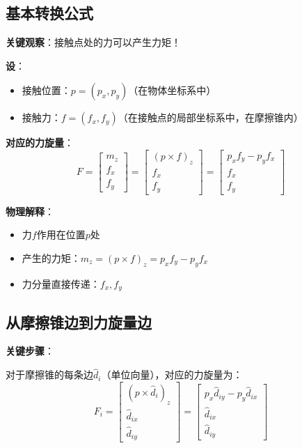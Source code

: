 \documentclass[12pt,a4paper]{article}
\begin{document}
\subsection{基本转换公式}

\textbf{关键观察}：接触点处的力可以产生力矩！

\textbf{设}：
\begin{itemize}
\item 接触位置：$p = (p_x, p_y)$（在物体坐标系中）
\item 接触力：$f = (f_x, f_y)$（在接触点的局部坐标系中，在摩擦锥内）
\end{itemize}

\textbf{对应的力旋量}：
\begin{equation}
F = \begin{bmatrix} m_z \\ f_x \\ f_y \end{bmatrix} = \begin{bmatrix} (p \times f)_z \\ f_x \\ f_y \end{bmatrix} = \begin{bmatrix} p_x f_y - p_y f_x \\ f_x \\ f_y \end{bmatrix}
\label{eq:force_to_wrench}
\end{equation}

\textbf{物理解释}：
\begin{itemize}
\item 力$f$作用在位置$p$处
\item 产生的力矩：$m_z = (p \times f)_z = p_x f_y - p_y f_x$
\item 力分量直接传递：$f_x, f_y$
\end{itemize}

\subsection{从摩擦锥边到力旋量边}

\textbf{关键步骤}：

对于摩擦锥的每条边$\hat{d}_i$（单位向量），对应的力旋量为：
\begin{equation}
F_i = \begin{bmatrix} (p \times \hat{d}_i)_z \\ \hat{d}_{ix} \\ \hat{d}_{iy} \end{bmatrix} = \begin{bmatrix} p_x \hat{d}_{iy} - p_y \hat{d}_{ix} \\ \hat{d}_{ix} \\ \hat{d}_{iy} \end{bmatrix}
\label{eq:cone_edge_to_wrench}
\end{equation}
\end{document}

